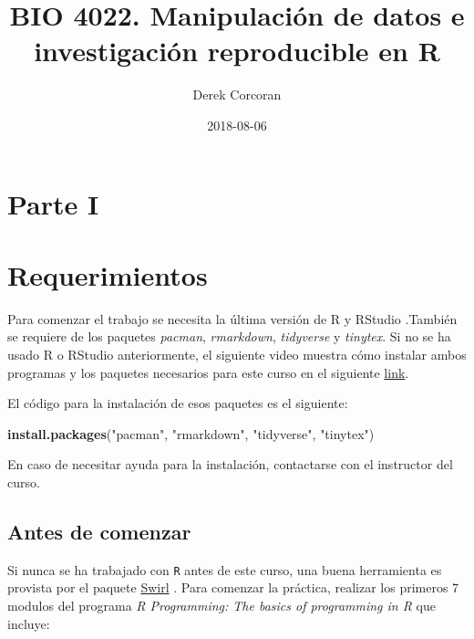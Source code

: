 \documentclass[]{book}
\title{BIO 4022. Manipulación de datos e investigación reproducible en R}
\author{Derek Corcoran}
\date{2018-08-06}
\newenvironment{Shaded}{\begin{snugshade}}{\end{snugshade}}
\newcommand{\KeywordTok}[1]{\textcolor[rgb]{0.13,0.29,0.53}{\textbf{#1}}}
\newcommand{\NormalTok}[1]{#1}
\newcommand{\StringTok}[1]{\textcolor[rgb]{0.31,0.60,0.02}{#1}}
\begin{document}
\maketitle

{
\setcounter{tocdepth}{1}
\tableofcontents
}
\hypertarget{parte-i}{%
\chapter*{Parte I}\label{parte-i}}

\hypertarget{requerimientos}{%
\chapter*{Requerimientos}\label{requerimientos}}

Para comenzar el trabajo se necesita la última versión de R y RStudio
\citep{R-base}.También se requiere de los paquetes \emph{pacman},
\emph{rmarkdown}, \emph{tidyverse} y \emph{tinytex}. Si no se ha usado R
o RStudio anteriormente, el siguiente video muestra cómo instalar ambos
programas y los paquetes necesarios para este curso en el siguiente
\href{https://youtu.be/RtkCAKXsVbw}{link}.

El código para la instalación de esos paquetes es el siguiente:

\begin{Shaded}
\begin{Highlighting}[]
\KeywordTok{install.packages}\NormalTok{(}\StringTok{"pacman"}\NormalTok{, }\StringTok{"rmarkdown"}\NormalTok{, }\StringTok{"tidyverse"}\NormalTok{, }\StringTok{"tinytex"}\NormalTok{)}
\end{Highlighting}
\end{Shaded}

En caso de necesitar ayuda para la instalación, contactarse con el
instructor del curso.

\hypertarget{antes-de-comenzar}{%
\section{Antes de comenzar}\label{antes-de-comenzar}}

Si nunca se ha trabajado con \texttt{R} antes de este curso, una buena
herramienta es provista por el paquete
\href{http://swirlstats.com/students.html}{Swirl} \citep{Kross2017}.
Para comenzar la práctica, realizar los primeros 7 modulos del programa
\emph{R Programming: The basics of programming in R} que incluye:
\end{document}
